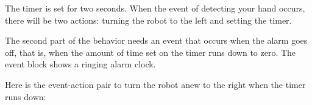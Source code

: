 The timer is set for two seconds. When the event of detecting your
hand occurs, there will be two actions: turning the robot to the left
and setting the timer.

The second part of the behavior needs an event that occurs when the alarm goes off,
that is, when the amount of time set on the timer runs down to zero. The
event block  shows a ringing alarm clock.

Here is the event-action pair to turn the robot anew to
the right when the timer runs down: 

